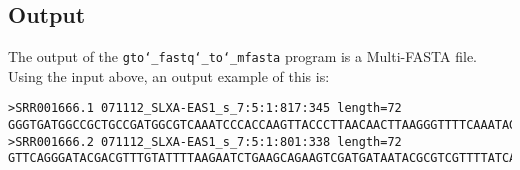 \subsection*{Output}
The output of the \texttt{gto\char`_fastq\char`_to\char`_mfasta} program is a Multi-FASTA file.\\
Using the input above, an output example of this is:
\begin{lstlisting}
>SRR001666.1 071112_SLXA-EAS1_s_7:5:1:817:345 length=72
GGGTGATGGCCGCTGCCGATGGCGTCAAATCCCACCAAGTTACCCTTAACAACTTAAGGGTTTTCAAATAGA
>SRR001666.2 071112_SLXA-EAS1_s_7:5:1:801:338 length=72
GTTCAGGGATACGACGTTTGTATTTTAAGAATCTGAAGCAGAAGTCGATGATAATACGCGTCGTTTTATCAT
\end{lstlisting}
